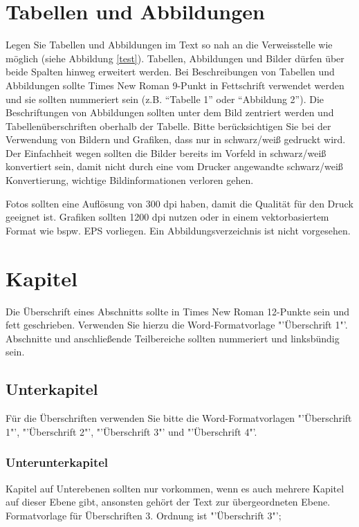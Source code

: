 {\section{Tabellen und Abbildungen}
\label{chap:tables}
Legen Sie Tabellen und Abbildungen im Text so nah an die Verweisstelle wie möglich (siehe Abbildung \ref{test}). Tabellen, Abbildungen und Bilder dürfen über beide Spalten hinweg erweitert werden. Bei Beschreibungen von Tabellen und Abbildungen sollte Times New Roman 9-Punkt in Fettschrift verwendet werden und sie sollten nummeriert sein (z.B. “Tabelle 1” oder “Abbildung 2”). Die Beschriftungen von Abbildungen sollten unter dem Bild zentriert werden und Tabellenüberschriften oberhalb der Tabelle.
Bitte berücksichtigen Sie bei der Verwendung von Bildern und Grafiken, dass nur in schwarz/weiß gedruckt wird. Der Einfachheit wegen sollten die Bilder bereits im Vorfeld in schwarz/weiß konvertiert sein, damit nicht
durch eine vom Drucker angewandte schwarz/weiß Konvertierung, wichtige Bildinformationen verloren gehen.

Fotos sollten eine Auflösung von 300 dpi haben, damit die Qualität für den Druck geeignet ist. Grafiken sollten 1200 dpi nutzen oder in einem vektorbasiertem Format wie bspw. EPS vorliegen. Ein Abbildungsverzeichnis ist nicht vorgesehen.

\section{Kapitel}
\label{chap:kapitel}
Die Überschrift eines Abschnitts sollte in Times New Roman 12-Punkte sein und fett geschrieben. Verwenden Sie hierzu die Word-Formatvorlage "'Überschrift 1"'. Abschnitte und anschließende Teilbereiche sollten nummeriert und linksbündig sein.

\subsection{Unterkapitel}
Für die Überschriften verwenden Sie bitte die Word-Formatvorlagen "'Überschrift 1"', "'Überschrift 2"', "'Überschrift 3"' und "'Überschrift 4"'.

\subsubsection{Unterunterkapitel}
Kapitel auf Unterebenen sollten nur vorkommen, wenn es auch mehrere Kapitel auf dieser Ebene gibt, ansonsten gehört der Text zur übergeordneten Ebene. Formatvorlage für Überschriften 3. Ordnung ist "'Überschrift 3"';

}
